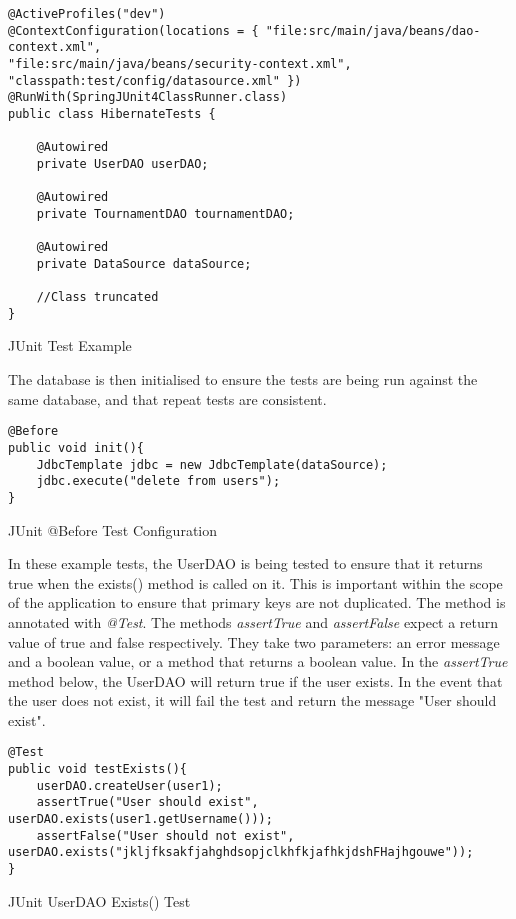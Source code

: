 \begin{table}[H]
\begin{lstlisting}
@ActiveProfiles("dev")
@ContextConfiguration(locations = { "file:src/main/java/beans/dao-context.xml",
"file:src/main/java/beans/security-context.xml",
"classpath:test/config/datasource.xml" })
@RunWith(SpringJUnit4ClassRunner.class)
public class HibernateTests {
	
	@Autowired
	private UserDAO userDAO;
	
	@Autowired
	private TournamentDAO tournamentDAO;
	
	@Autowired
	private DataSource dataSource;
	
	//Class truncated 
}

\end{lstlisting}
\caption{JUnit Test Example}
\end{table}

The database is then initialised to ensure the tests are being run against the same database, and that repeat tests are consistent.

\begin{table}[H]
\begin{lstlisting}
@Before
public void init(){
	JdbcTemplate jdbc = new JdbcTemplate(dataSource);
	jdbc.execute("delete from users"); 
}
\end{lstlisting}
\caption{JUnit @Before Test Configuration}
\end{table}

In these example tests, the UserDAO is being tested to ensure that it returns true when the exists() method is called on it. This is important within the scope of the application to ensure that primary keys are not duplicated. The method is annotated with \textit{@Test}. The methods \textit{assertTrue} and \textit{assertFalse} expect a return value of true and false respectively. They take two parameters: an error message and a boolean value, or a method that returns a boolean value. In the \textit{assertTrue} method below, the UserDAO will return true if the user exists. In the event that the user does not exist, it will fail the test and return the message "User should exist".\newline 

\begin{table}[H]
\begin{lstlisting}
@Test
public void testExists(){
	userDAO.createUser(user1);
	assertTrue("User should exist", userDAO.exists(user1.getUsername()));
	assertFalse("User should not exist", userDAO.exists("jkljfksakfjahghdsopjclkhfkjafhkjdshFHajhgouwe"));
}
\end{lstlisting}
\caption{JUnit UserDAO Exists() Test}
\end{table}

